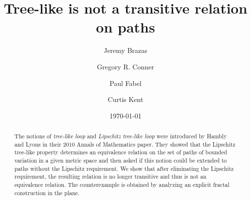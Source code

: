 \documentclass[11pt, leqno]{amsart}
\theoremstyle{definition}\newtheorem{definition}[theorem]{Definition}
\begin{document}
\title[Tree-like]{Tree-like is not a transitive relation on paths}



\author[J. Brazas]{Jeremy Brazas}
\address{West Chester University\\ Department of Mathematics\\
West Chester, PA 19383, USA}

\author[G.R. Conner]{Gregory R. Conner}
\address{Brigham Young University\\ Department of Mathematics \\
Provo, UT 84602, USA}


\author[P. Fabel]{Paul Fabel}
\address{Mississippi State University\\ Department of Mathematics and Statistics\\
Mississippi State, MS 39762, USA}

\author[C. Kent]{Curtis Kent}
\address{Brigham Young University\\ Department of Mathematics \\
Provo, UT 84602, USA}

\date{\today}

\begin{abstract}
The notions of \emph{tree-like loop} and \emph{Lipschitz tree-like loop} were introduced by Hambly and Lyons in their 2010 Annals of Mathematics paper. They showed that the Lipschitz tree-like property determines an equivalence relation on the set of paths of bounded variation in a given metric space and then asked if this notion could be extended to paths without the Lipschitz requirement. We show that after eliminating the Lipschitz requirement, the resulting relation is no longer transitive and thus is not an equivalence relation. The counterexample is obtained by analyzing an explicit fractal construction in the plane.
\end{abstract}

\begingroup
\def\uppercasenonmath#1{} %
\let\MakeUppercase\relax %
\maketitle
\endgroup
\end{document}
